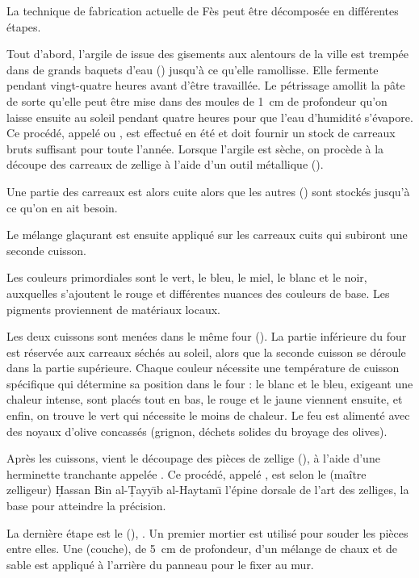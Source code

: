 La technique de fabrication actuelle de Fès peut être décomposée en 
différentes étapes.

Tout d'abord, l'argile de  issue des gisements aux 
alentours de la ville est trempée dans de grands baquets d'eau 
(\zwabi) jusqu'à ce qu'elle ramollisse. Elle fermente pendant 
vingt-quatre heures avant d'être travaillée. Le pétrissage amollit 
la pâte de sorte qu'elle peut être mise dans des moules de \SI{1}{\cm} 
de profondeur qu'on laisse ensuite au soleil pendant quatre heures 
pour que l'eau d'humidité s'évapore. Ce procédé, appelé \tansif ou 
\tagfif, est effectué en été et doit fournir un stock de carreaux 
bruts suffisant pour toute l'année. Lorsque l'argile est sèche, on 
procède à la découpe des carreaux de zellige à l'aide d'un outil 
métallique (\alqala).

Une partie des carreaux est alors cuite alors que les autres 
(\mzihrinayy) sont stockés jusqu'à ce qu'on en ait besoin.

Le mélange glaçurant est ensuite appliqué sur les carreaux cuits qui 
subiront une seconde cuisson.

Les couleurs primordiales sont le vert, le bleu, le miel, le blanc 
et le noir, auxquelles s'ajoutent le rouge et différentes nuances 
des couleurs de base. Les pigments proviennent de matériaux locaux.

Les deux cuissons sont menées dans le même four (\farina). La partie 
inférieure du four est réservée aux carreaux séchés au soleil, alors 
que la seconde cuisson se déroule dans la partie supérieure. Chaque 
couleur nécessite une température de cuisson spécifique qui détermine 
sa position dans le four : le blanc et le bleu, exigeant une chaleur 
intense, sont placés tout en bas, le rouge et le jaune viennent 
ensuite, et enfin, on trouve le vert qui nécessite le moins de 
chaleur. Le feu est alimenté avec des noyaux d'olive concassés 
(grignon, déchets solides du broyage des olives).

Après les cuissons, vient le découpage des pièces de zellige 
(), à l'aide d'une herminette tranchante 
appelée \manqas. Ce procédé, appelé \naqs, est selon le \zlaygi 
(maître zelligeur) \d{H}assan Bin al-\d{T}ayy\={\i}b al-Haytam\={\i} 
l'épine dorsale de l'art des zelliges, la base pour atteindre la 
précision.

La dernière étape est le \fars (), 
\autocite{Damluji_1993a}. Un premier mortier est utilisé pour souder 
les pièces entre elles. Une \tafrisa (couche), de \SI{5}{\cm} de 
profondeur, d'un mélange de chaux et de sable est appliqué à 
l'arrière du panneau pour le fixer au mur.

